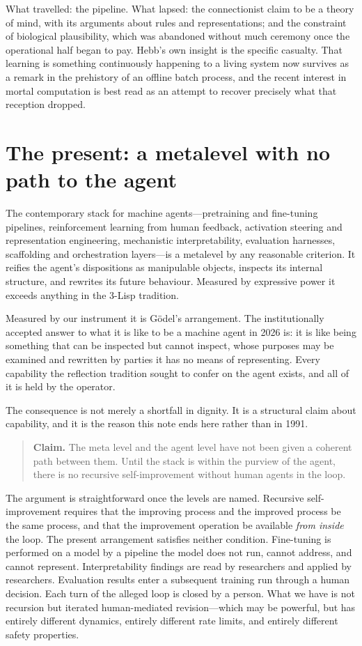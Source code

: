 \documentclass[11pt,a4paper]{article}
\begin{document}
What travelled: the pipeline. What lapsed: the connectionist claim to be a theory
of mind, with its arguments about rules and representations; and the constraint
of biological plausibility, which was abandoned without much ceremony once the
operational half began to pay. Hebb's own insight is the specific casualty. That
learning is something continuously happening to a living system now survives as a
remark in the prehistory of an offline batch process, and the recent interest in
mortal computation \cite{hinton2022} is best read as an attempt to recover
precisely what that reception dropped.

\section{The present: a metalevel with no path to the agent}
\label{sec:present}

The contemporary stack for machine agents---pretraining and fine-tuning
pipelines, reinforcement learning from human feedback, activation steering and
representation engineering, mechanistic interpretability, evaluation harnesses,
scaffolding and orchestration layers---is a metalevel by any reasonable
criterion. It reifies the agent's dispositions as manipulable objects, inspects
its internal structure, and rewrites its future behaviour. Measured by
expressive power it exceeds anything in the 3-Lisp tradition.

Measured by our instrument it is G\"odel's arrangement. The institutionally
accepted answer to what it is like to be a machine agent in 2026 is: it is like
being something that can be inspected but cannot inspect, whose purposes may be
examined and rewritten by parties it has no means of representing. Every
capability the reflection tradition sought to confer on the agent exists, and all
of it is held by the operator.

The consequence is not merely a shortfall in dignity. It is a structural claim
about capability, and it is the reason this note ends here rather than in
1991.

\begin{quote}
\textbf{Claim.} The meta level and the agent level have not been given a coherent
path between them. Until the stack is within the purview of the agent, there is no
recursive self-improvement without human agents in the loop.
\end{quote}

The argument is straightforward once the levels are named. Recursive
self-improvement requires that the improving process and the improved process be
the same process, and that the improvement operation be available \emph{from
inside} the loop. The present arrangement satisfies neither condition. Fine-tuning
is performed on a model by a pipeline the model does not run, cannot address, and
cannot represent. Interpretability findings are read by researchers and applied by
researchers. Evaluation results enter a subsequent training run through a human
decision. Each turn of the alleged loop is closed by a person. What we have is not
recursion but iterated human-mediated revision---which may be powerful, but has
entirely different dynamics, entirely different rate limits, and entirely
different safety properties.
\end{document}

